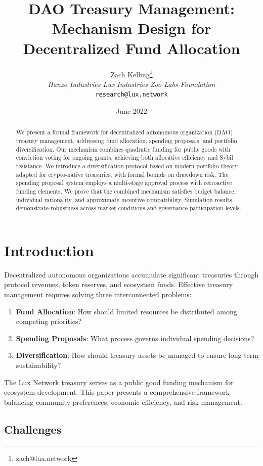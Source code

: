 \documentclass[11pt,a4paper]{article}
\title{DAO Treasury Management:\\Mechanism Design for Decentralized Fund Allocation}
\author{Zach Kelling\thanks{zach@lux.network} \\ \textit{Hanzo Industries \quad Lux Industries \quad Zoo Labs Foundation} \\ \texttt{research@lux.network}}
\date{June 2022}
\theoremstyle{definition}
\theoremstyle{remark}
\begin{document}
\maketitle

\begin{abstract}
We present a formal framework for decentralized autonomous organization (DAO) treasury management, addressing fund allocation, spending proposals, and portfolio diversification. Our mechanism combines quadratic funding for public goods with conviction voting for ongoing grants, achieving both allocative efficiency and Sybil resistance. We introduce a diversification protocol based on modern portfolio theory adapted for crypto-native treasuries, with formal bounds on drawdown risk. The spending proposal system employs a multi-stage approval process with retroactive funding elements. We prove that the combined mechanism satisfies budget balance, individual rationality, and approximate incentive compatibility. Simulation results demonstrate robustness across market conditions and governance participation levels.
\end{abstract}

\section{Introduction}

Decentralized autonomous organizations accumulate significant treasuries through protocol revenues, token reserves, and ecosystem funds. Effective treasury management requires solving three interconnected problems:

\begin{enumerate}[label=(\roman*)]
    \item \textbf{Fund Allocation}: How should limited resources be distributed among competing priorities?
    \item \textbf{Spending Proposals}: What process governs individual spending decisions?
    \item \textbf{Diversification}: How should treasury assets be managed to ensure long-term sustainability?
\end{enumerate}

The Lux Network treasury serves as a public good funding mechanism for ecosystem development. This paper presents a comprehensive framework balancing community preferences, economic efficiency, and risk management.

\subsection{Challenges}
\end{document}
